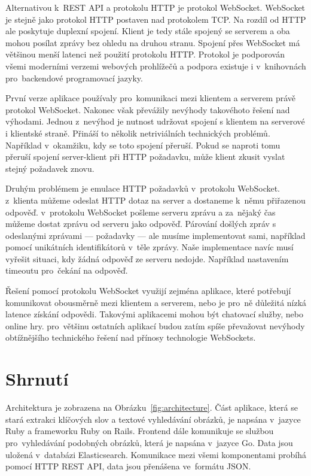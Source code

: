 Alternativou k~REST API a protokolu HTTP je protokol WebSocket\cite{websocket}. WebSocket je stejně jako protokol HTTP postaven nad protokolem TCP. Na rozdíl od HTTP ale poskytuje duplexní spojení. Klient je tedy stále spojený se serverem a oba mohou posílat zprávy bez ohledu na druhou stranu. Spojení přes WebSocket má většinou menší latenci než použití protokolu HTTP\cite{websocket-study}. Protokol je podporován všemi moderními verzemi webových prohlížečů a podpora existuje i v~knihovnách pro~backendové programovací jazyky.

První verze aplikace používaly pro~komunikaci mezi klientem a serverem právě protokol WebSocket. Nakonec však převážily nevýhody takovéhoto řešení nad výhodami. Jednou z~nevýhod je nutnost udržovat spojení s klientem na serverové i klientské straně. Přináší to několik netriviálních technických problémů. Například v~okamžiku, kdy se toto spojení přeruší. Pokud se naproti tomu přeruší spojení server-klient při HTTP požadavku, může klient zkusit vyslat stejný požadavek znovu.

Druhým problémem je emulace HTTP požadavků v~protokolu WebSocket. z~klienta můžeme odeslat HTTP dotaz na server a dostaneme k~němu přiřazenou odpověď. v~protokolu WebSocket pošleme serveru zprávu a za~nějaký čas můžeme dostat zprávu od serveru jako odpověď. Párování došlých zpráv s odeslanými zprávami --- požadavky --- ale musíme implementovat sami, například pomocí unikátních identifikátorů v~těle zprávy. Naše implementace navíc musí vyřešit situaci, kdy žádná odpověď ze serveru nedojde. Například nastavením timeoutu pro~čekání na odpověď.

Řešení pomocí protokolu WebSocket využijí zejména aplikace, které potřebují komunikovat obousměrně mezi klientem a serverem, nebo je pro~ně důležitá nízká latence získání odpovědi. Takovými aplikacemi mohou být chatovací služby, nebo online hry. pro~většinu ostatních aplikací budou zatím spíše převažovat nevýhody obtížnějšího technického řešení nad přínosy technologie WebSockets.

\section{Shrnutí}


Architektura je zobrazena na Obrázku~\ref{fig:architecture}. Část aplikace, která se stará extrakci klíčových slov a textové vyhledávání obrázků, je napsána v~jazyce Ruby a frameworku Ruby on Rails. Frontend dále komunikuje se službou pro~vyhledávání podobných obrázků, která je napsána v~jazyce Go. Data jsou uložená v~databázi Elasticsearch. Komunikace mezi všemi komponentami probíhá pomocí HTTP REST API, data jsou přenášena ve~formátu JSON.








